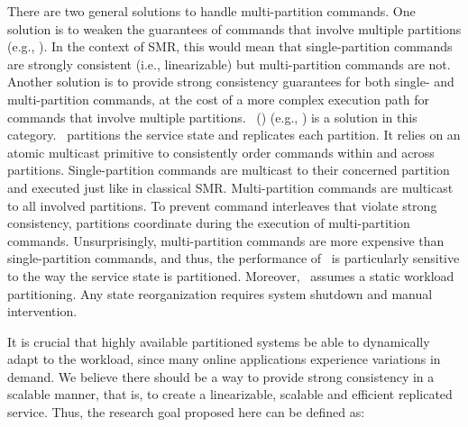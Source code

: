 There are two general solutions to handle multi-partition commands. One solution
is to weaken the guarantees of commands that involve multiple partitions (e.g.,
\cite{facebookTAO}). In the context of SMR, this would mean that
single-partition commands are strongly consistent (i.e., linearizable) but
multi-partition commands are not. Another solution is to provide strong
consistency guarantees for both single- and multi-partition commands, at the
cost of a more complex execution path for commands that involve multiple
partitions. \ssmrlong\ (\ssmr) (e.g., \cite{bezerra2014ssmr}) is a solution in
this category. \ssmr\ partitions the service state and replicates each
partition. It relies on an atomic multicast primitive to consistently order
commands within and across partitions. Single-partition commands are multicast
to their concerned partition and executed just like in classical SMR.
Multi-partition commands are multicast to all involved partitions. To prevent
command interleaves that violate strong consistency, partitions coordinate
during the execution of multi-partition commands. Unsurprisingly,
multi-partition commands are more expensive than single-partition commands, and
thus, the performance of \ssmr\ is particularly sensitive to the way the service
state is partitioned. Moreover, \ssmr\ assumes a static workload partitioning.
Any state reorganization requires system shutdown and manual intervention.


It is crucial that highly available partitioned systems be able to dynamically
adapt to the workload, since many online applications experience variations in
demand. We believe there should be a way to provide strong consistency in a
scalable manner, that is, to create a linearizable, scalable and efficient
replicated service. Thus, the research goal proposed here can be defined as:

